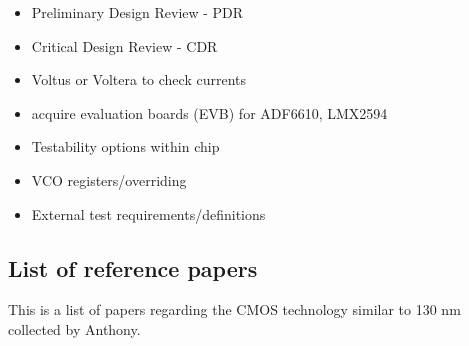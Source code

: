\documentclass{article}
\begin{document}
\begin{itemize}
	\item Preliminary Design Review	- PDR
	\item Critical Design Review	- CDR
	\item Voltus or Voltera to check currents
	\item acquire evaluation boards (EVB) for ADF6610, LMX2594
	\item Testability options within chip
	\item VCO registers/overriding
	\item External test requirements/definitions
\end{itemize}


\subsection{List of reference papers} %

This is a list of papers regarding the CMOS technology similar to 130 nm collected by Anthony.
\end{document}
